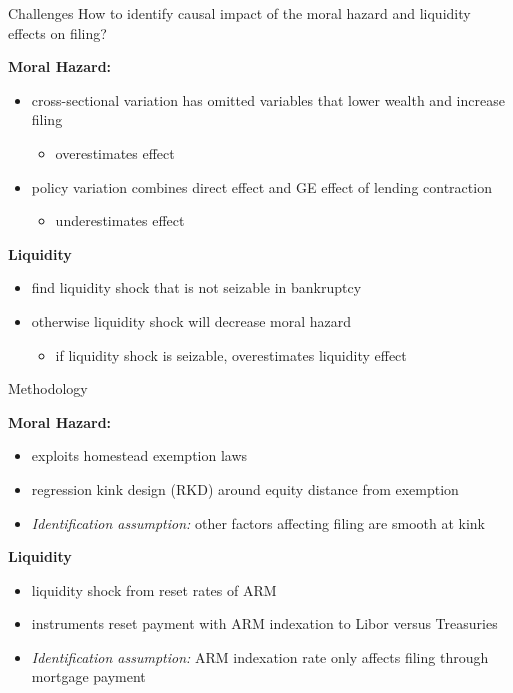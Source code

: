 \documentclass[aspectratio=169]{beamer}
\begin{document}
\begin{frame}{Challenges}
    How to identify causal impact of the moral hazard and liquidity effects on filing?
    \vspace{0.3cm}

    \textbf{Moral Hazard:}
    \begin{itemize}
        \item cross-sectional variation has omitted variables that lower wealth and increase filing
        \begin{itemize}
            \vspace{-0.4cm}
            \item[$\rightarrow$] overestimates effect
        \end{itemize}
        \item policy variation combines direct effect and GE effect of lending contraction
        \begin{itemize}
            \item[$\rightarrow$] underestimates effect
        \end{itemize}
    \end{itemize}
    \vspace{0.3cm}
    \textbf{Liquidity}
    \begin{itemize}
        \item find liquidity shock that is not seizable in bankruptcy
        \item otherwise liquidity shock will decrease moral hazard
        \begin{itemize}
            \item[$\rightarrow$] if liquidity shock is seizable, overestimates liquidity effect
        \end{itemize}
    \end{itemize}
\end{frame}

\begin{frame}{Methodology}

\textbf{Moral Hazard:}
\begin{itemize}
    \item exploits homestead exemption laws
    \item regression kink design (RKD) around equity distance from exemption
    \item \textit{Identification assumption:} other factors affecting filing are smooth at kink
\end{itemize}
\vspace{0.3cm}
\textbf{Liquidity}
\begin{itemize}
    \item liquidity shock from reset rates of ARM
    \item instruments reset payment with ARM indexation to Libor versus Treasuries
    \item \textit{Identification assumption:} ARM indexation rate only affects filing through mortgage payment
\end{itemize}
    
\end{frame}
\end{document}
